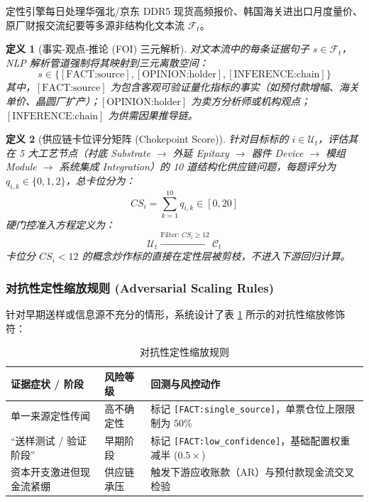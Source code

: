 \documentclass[11pt,a4paper]{article}
\newtheorem{definition}{定义}
\begin{document}
定性引擎每日处理华强北/京东 DDR5 现货高频报价、韩国海关进出口月度量价、原厂财报交流纪要等多源非结构化文本流 $\mathcal{F}_t$。

\begin{definition}[事实-观点-推论 (FOI) 三元解析]
对文本流中的每条证据句子 $s \in \mathcal{F}_t$，NLP 解析管道强制将其映射到三元离散空间：
\begin{equation}
s \in \{[\text{FACT:source}], [\text{OPINION:holder}], [\text{INFERENCE:chain}]\}
\end{equation}
其中，$[\text{FACT:source}]$ 为包含客观可验证量化指标的事实（如预付款增幅、海关单价、晶圆厂扩产）；$[\text{OPINION:holder}]$ 为卖方分析师或机构观点；$[\text{INFERENCE:chain}]$ 为供需因果推导链。
\end{definition}

\begin{definition}[供应链卡位评分矩阵 (Chokepoint Score)]
针对目标标的 $i \in \mathcal{U}_t$，评估其在 5 大工艺节点（衬底 Substrate $\to$ 外延 Epitaxy $\to$ 器件 Device $\to$ 模组 Module $\to$ 系统集成 Integration）的 10 道结构化供应链问题，每题评分为 $q_{i,k} \in \{0, 1, 2\}$，总卡位分为：
\begin{equation}
CS_i = \sum_{k=1}^{10} q_{i,k} \in [0, 20]
\end{equation}
硬门控准入方程定义为：
\begin{equation}
\mathcal{U}_t \xrightarrow{\text{Filter: } CS_i \ge 12} \mathcal{C}_t
\end{equation}
卡位分 $CS_i < 12$ 的概念炒作标的直接在定性层被剪枝，不进入下游回归计算。
\end{definition}

\subsubsection{对抗性定性缩放规则 (Adversarial Scaling Rules)}
针对早期送样或信息源不充分的情形，系统设计了表 \ref{tab:adversarial} 所示的对抗性缩放修饰符：
\begin{table}[htbp]
\centering
\small
\caption{对抗性定性缩放规则}
\label{tab:adversarial}
\begin{tabular}{lll}
\toprule
\textbf{证据症状 / 阶段} & \textbf{风险等级} & \textbf{回测与风控动作} \\
\midrule
单一来源定性传闻 & 高不确定性 & 标记 \texttt{[FACT:single\_source]}，单票仓位上限限制为 $50\%$ \\
``送样测试 / 验证阶段'' & 早期阶段 & 标记 \texttt{[FACT:low\_confidence]}，基础配置权重减半 ($0.5\times$) \\
资本开支激进但现金流紧绷 & 供应链承压 & 触发下游应收账款（AR）与预付款现金流交叉检验 \\
\bottomrule
\end{tabular}
\end{table}
\end{document}
